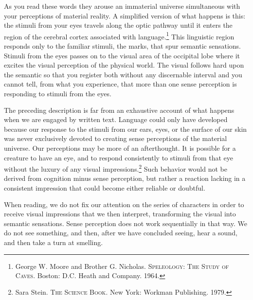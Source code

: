 \documentclass[
]{memoir}
\begin{document}
As you read these words they arouse an immaterial universe simultaneous
with your perceptions of material reality. A simplified version of what
happens is this: the stimuli from your eyes travels along the optic
pathway until it enters the region of the cerebral cortex associated
with language.\footnote{George W. Moore and Brother G. Nicholas.
  \textsc{Speleology: The Study of Caves}. Boston: D.C. Heath and
  Company. 1964.} This linguistic region responds only to the familiar
stimuli, the marks, that spur semantic sensations. Stimuli from the eyes
passes on to the visual area of the occipital lobe where it excites the
visual perception of the physical world. The visual follows hard upon
the semantic so that you register both without any discernable interval
and you cannot tell, from what you experience, that more than one sense
perception is responding to stimuli from the eyes.

The preceding description is far from an exhaustive account of what
happens when we are engaged by written text. Language could only have
developed because our response to the stimuli from our ears, eyes, or
the surface of our skin was never exclusively devoted to creating sense
perceptions of the material universe. Our perceptions may be more of an
afterthought. It is possible for a creature to have an eye, and to
respond consistently to stimuli from that eye without the luxury of any
visual impressions.\footnote{Sara Stein. \textsc{The Science Book}. New
  York: Workman Publishing. 1979.} Such behavior would not be derived
from cognition minus sense perception, but rather a reaction lacking in
a consistent impression that could become either reliable or doubtful.

When reading, we do not fix our attention on the series of characters in
order to receive visual impressions that we then interpret, transforming
the visual into semantic sensations. Sense perception does not work
sequentially in that way. We do not see something, and then, after we
have concluded seeing, hear a sound, and then take a turn at smelling.
\end{document}
